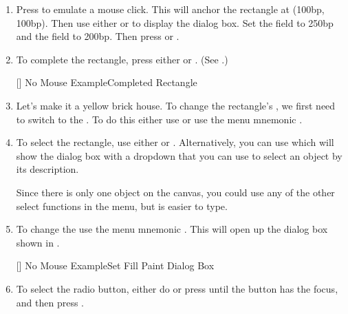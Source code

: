 \begin{enumerate}
[]
{}
{No Mouse Example\dash Go To Co-Ordinate Dialog Box}

\item Press  to emulate a mouse
click.  This will anchor the rectangle at (100bp, 100bp). Then use
either  or
 to display the  dialog
box. Set the  field to 250bp and the
 field to 200bp. Then press
 or .

\item To complete the rectangle, press either  or 
.
(See .)

[]
{}
{No Mouse Example\dash Completed Rectangle}

\item Let's make it a yellow brick house. To change the rectangle's
, we first need to switch to the . To do this
either use  or use the menu mnemonic
.

\item To select the rectangle, use either
 or .
Alternatively, you can use  which
will show the  dialog box with a \gls{dropdown} that you can use to
select an object by its description.

\begin{information}
Since there is only one object on the canvas, you could use any of the other select
functions in the  menu, but
 is easier to type.
\end{information}

\item To change the  use the menu mnemonic
. This will open up
the  dialog box shown in .

[]
{}
{No Mouse Example\dash Set Fill Paint Dialog Box}

\item To select the  radio button,
either do  or press  until
the  button has the focus, and then
press .


\end{enumerate}
